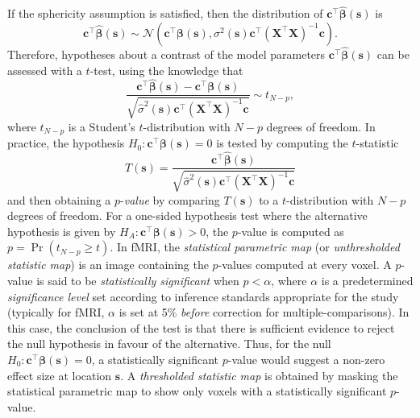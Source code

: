 If the sphericity assumption is satisfied, then the distribution of $\bm{c}^{\intercal}\bm{\hat{\beta}}(\bm{s})$ is 
\begin{equation}
\label{eq:contrast_distribution}
\bm{c}^{\intercal}\bm{\hat{\beta}}(\bm{s}) \sim \mathcal{N}(\bm{c}^{\intercal}\bm{\beta}(\bm{s}), \sigma^{2}(\bm{s})\bm{c}^{\intercal}(\bm{X}^{\intercal}\bm{X})^{-1}\bm{c}).
\end{equation}
Therefore, hypotheses about a contrast of the model parameters $\bm{c}^{\intercal}\bm{\hat{\beta}}(\bm{s})$ can be assessed with a $t$-test, using the knowledge that
\begin{equation}
\label{eq:contrast_minus_param_distribution}
\frac{\bm{c}^{\intercal}\bm{\hat{\beta}}(\bm{s}) - \bm{c}^{\intercal}\bm{\beta}(\bm{s})}{\sqrt{\hat{\sigma}^{2}(\bm{s})\bm{c}^{\intercal}(\bm{X}^{\intercal}\bm{X})^{-1}\bm{c}}} \sim t_{N-p},
\end{equation}
where $t_{N-p}$ is a  Student's $t$-distribution with $N-p$ degrees of freedom. In practice, the hypothesis $H_{0} : \bm{c}^{\intercal}\bm{\beta}(\bm{s}) = 0$ is tested by computing the $t$-statistic 
\begin{equation}
\label{eq:t_statistic}
T(\bm{s}) = \frac{\bm{c}^{\intercal}\bm{\hat{\beta}}(\bm{s})}{\sqrt{\hat{\sigma}^{2}(\bm{s})\bm{c}^{\intercal}(\bm{X}^{\intercal}\bm{X})^{-1}\bm{c}}}
\end{equation}
and then obtaining a $p$-\textit{value} by comparing $T(\bm{s})$ to a $t$-distribution with $N-p$ degrees of freedom. For a one-sided hypothesis test where the alternative hypothesis is given by $H_{A} : \bm{c}^{\intercal}\bm{\beta}(\bm{s}) > 0$, the $p$-value is computed as $p = \Pr(t_{N-p} \geq t)$. In fMRI, the \textit{statistical parametric map} (or \textit{unthresholded statistic map}) is an image containing the $p$-values computed at every voxel. A $p$-value is said to be \textit{statistically significant} when $p < \alpha$, where $\alpha$ is a predetermined \textit{significance level} set according to inference standards appropriate for the study (typically for fMRI, $\alpha$ is set at 5\% \textit{before} correction for multiple-comparisons). In this case, the conclusion of the test is that there is sufficient evidence to reject the null hypothesis in favour of the alternative. Thus, for the null $H_{0} : \bm{c}^{\intercal}\bm{\beta}(\bm{s}) = 0$, a statistically significant $p$-value would suggest a non-zero effect size at location $\bm{s}$. A \textit{thresholded statistic map} is obtained by masking the statistical parametric map to show only voxels with a statistically significant $p$-value. 


